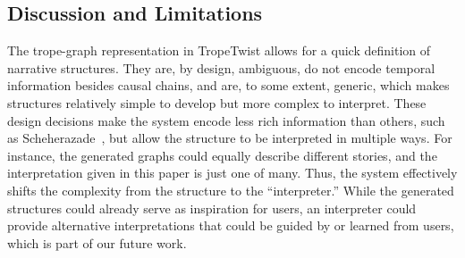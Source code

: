 \subsection{Discussion and Limitations}




The trope-graph representation in TropeTwist allows for a quick definition of narrative structures. They are, by design, ambiguous, do not encode temporal information besides causal chains, and are, to some extent, generic, which makes structures relatively simple to develop but more complex to interpret. These design decisions make the system encode less rich information than others, such as Scheherazade~, but allow the structure to be interpreted in multiple ways. For instance, the generated graphs could equally describe different stories, and the interpretation given in this paper is just one of many. Thus, the system effectively shifts the complexity from the structure to the ``interpreter.'' While the generated structures could already serve as inspiration for users, an interpreter could provide alternative interpretations that could be guided by or learned from users, which is part of our future work.


